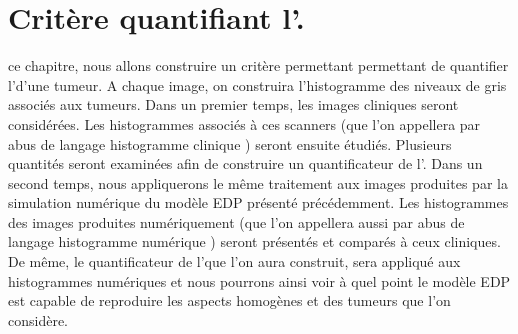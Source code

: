 \documentclass[main.tex]{subfiles}
\begin{document}



\chapter{Critère quantifiant l'\hetero. \label{chap:crit_hetero}}
 ce chapitre, nous allons construire un critère permettant permettant de quantifier l'\hetero d'une tumeur.
A chaque image, on construira l'histogramme des niveaux de gris associés aux tumeurs. 
Dans un premier temps, les images cliniques seront considérées. Les histogrammes associés à ces scanners (que l'on appellera par abus de langage \og histogramme clinique \fg) seront ensuite étudiés. Plusieurs quantités seront examinées afin de construire un quantificateur de l'\hetero.
Dans un second temps, nous appliquerons le même traitement aux images produites par la simulation numérique du modèle EDP présenté précédemment. Les histogrammes des images produites numériquement (que l'on appellera aussi par abus de langage \og histogramme numérique \fg) seront présentés et comparés à ceux cliniques. De même, le quantificateur de l'\hetero que l'on aura construit, sera appliqué aux histogrammes numériques et nous pourrons ainsi voir à quel point le modèle EDP est capable de reproduire les aspects homogènes et \heterogenes des tumeurs que l'on considère.
\end{document}
